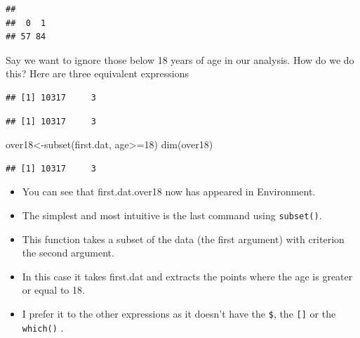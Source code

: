 \documentclass[
]{gitbook}
\newenvironment{Shaded}{\begin{snugshade}}{\end{snugshade}}
\newcommand{\DecValTok}[1]{\textcolor[rgb]{0.00,0.00,0.81}{#1}}
\newcommand{\FunctionTok}[1]{\textcolor[rgb]{0.00,0.00,0.00}{#1}}
\newcommand{\NormalTok}[1]{#1}
\newcommand{\OtherTok}[1]{\textcolor[rgb]{0.56,0.35,0.01}{#1}}
\newcommand{\SpecialCharTok}[1]{\textcolor[rgb]{0.00,0.00,0.00}{#1}}
\begin{document}
\begin{verbatim}
## 
##  0  1 
## 57 84
\end{verbatim}

Say we want to ignore those below 18 years of age in our analysis. How do we do this? Here are three equivalent expressions

\begin{Shaded}
\end{Shaded}

\begin{verbatim}
## [1] 10317     3
\end{verbatim}

\begin{Shaded}
\end{Shaded}

\begin{verbatim}
## [1] 10317     3
\end{verbatim}

\begin{Shaded}
\begin{Highlighting}[]
\NormalTok{over18}\OtherTok{\textless{}{-}}\FunctionTok{subset}\NormalTok{(first.dat, age}\SpecialCharTok{\textgreater{}=}\DecValTok{18}\NormalTok{)}
\FunctionTok{dim}\NormalTok{(over18)}
\end{Highlighting}
\end{Shaded}

\begin{verbatim}
## [1] 10317     3
\end{verbatim}

\begin{itemize}
\item
  You can see that first.dat.over18 now has appeared in Environment.
\item
  The simplest and most intuitive is the last command using \texttt{subset()}.
\item
  This function takes a subset of the data (the first argument) with criterion the second argument.
\item
  In this case it takes first.dat and extracts the points where the age is greater or equal to 18.
\item
  I prefer it to the other expressions as it doesn't have the \texttt{\$}, the \texttt{{[}{]}} or the \texttt{which()} .
\end{itemize}
\end{document}
